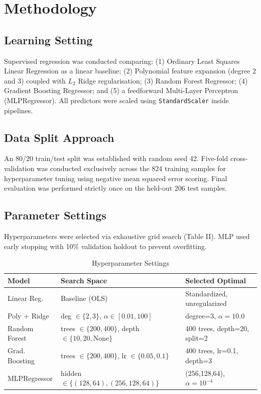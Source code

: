 \documentclass[conference]{IEEEtran}
\begin{document}
\section{Methodology}
\subsection{Learning Setting}
Supervised regression was conducted comparing: (1) Ordinary Least Squares Linear Regression as a linear baseline; (2) Polynomial feature expansion (degree 2 and 3) coupled with $L_2$ Ridge regularisation; (3) Random Forest Regressor; (4) Gradient Boosting Regressor; and (5) a feedforward Multi-Layer Perceptron (MLPRegressor). All predictors were scaled using \texttt{StandardScaler} inside pipelines.

\subsection{Data Split Approach}
An 80/20 train/test split was established with random seed 42. Five-fold cross-validation was conducted exclusively across the 824 training samples for hyperparameter tuning using negative mean squared error scoring. Final evaluation was performed strictly once on the held-out 206 test samples.

\subsection{Parameter Settings}
Hyperparameters were selected via exhaustive grid search (Table II). MLP used early stopping with 10\% validation holdout to prevent overfitting.

\begin{table}[htbp]
\caption{Hyperparameter Settings}
\begin{center}
\begin{tabular}{lll}
\toprule
\textbf{Model} & \textbf{Search Space} & \textbf{Selected Optimal} \\
\midrule
Linear Reg. & Baseline (OLS) & Standardized, unregularized \\
Poly + Ridge & deg $\in \{2,3\}$, $\alpha \in [0.01, 100]$ & degree=3, $\alpha=10.0$ \\
Random Forest & trees $\in \{200,400\}$, depth $\in \{10,20,\text{None}\}$ & 400 trees, depth=20, split=2 \\
Grad. Boosting & trees $\in \{200,400\}$, lr $\in \{0.05,0.1\}$ & 400 trees, lr=0.1, depth=3 \\
MLPRegressor & hidden $\in \{(128,64), (256,128,64)\}$ & (256,128,64), $\alpha=10^{-4}$ \\
\bottomrule
\end{tabular}
\end{center}
\end{table}
\end{document}
